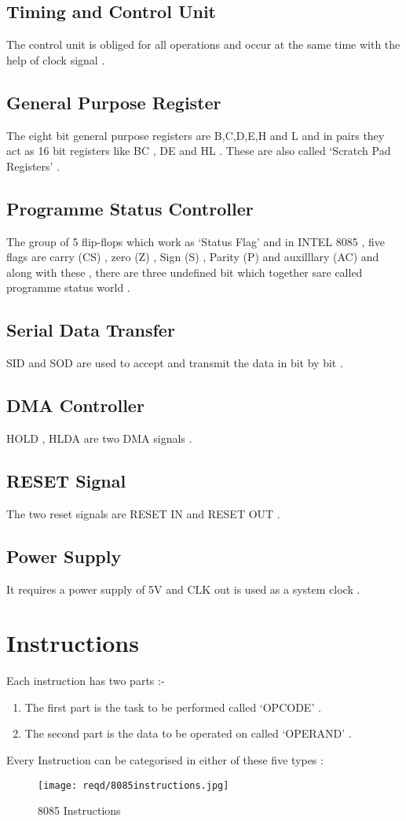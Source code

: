 \documentclass[14pt]{article}
\begin{document}
\subsection{Timing and Control Unit}
The control unit is obliged for all operations and occur at the same time with the help of clock signal .
\subsection{General Purpose Register}
The eight bit general purpose registers are B,C,D,E,H and L and in pairs they act as 16 bit registers like BC , DE and HL . These are also called `Scratch Pad Registers' .
\subsection{Programme Status Controller}
The group of 5 flip-flops which work as `Status Flag' and in INTEL 8085 , five flags are carry (CS) , zero (Z) , Sign (S) , Parity (P) and auxilllary (AC) and along with these , there are three undefined bit which together sare called programme status world .
\subsection{Serial Data Transfer}
SID and SOD are used to accept and transmit the data in bit by bit .
\subsection{DMA Controller}
HOLD , HLDA are two DMA signals .
\subsection{RESET Signal}
The two reset signals are RESET IN and RESET OUT .
\subsection{Power Supply}
It requires a power supply of 5V and CLK out is used as a system clock . 



\section{Instructions}
Each instruction has two parts :-
\begin{enumerate}
\item{The first part is the task to be performed called `OPCODE' .}
\item{The second part is the data to be operated on called `OPERAND' .}
\end{enumerate}
Every Instruction can be categorised in either of these five types :
\begin{figure}[h]
	\centering
	\texttt{[image: reqd/8085instructions.jpg]}
	\caption{8085 Instructions}
\end{figure}
\end{document}
